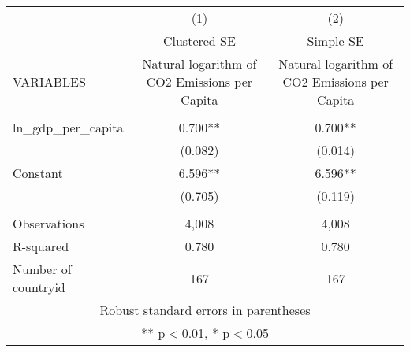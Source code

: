 \begin{tabular}{lcc} \hline
 & (1) & (2) \\
 & Clustered SE & Simple SE \\
VARIABLES & Natural logarithm of CO2 Emissions per Capita & Natural logarithm of CO2 Emissions per Capita \\ \hline
 &  &  \\
ln\_gdp\_per\_capita & 0.700** & 0.700** \\
 & (0.082) & (0.014) \\
Constant & 6.596** & 6.596** \\
 & (0.705) & (0.119) \\
 &  &  \\
Observations & 4,008 & 4,008 \\
R-squared & 0.780 & 0.780 \\
 Number of countryid & 167 & 167 \\ \hline
\multicolumn{3}{c}{ Robust standard errors in parentheses} \\
\multicolumn{3}{c}{ ** p$<$0.01, * p$<$0.05} \\
\end{tabular}

